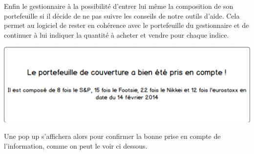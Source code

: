 \documentclass[french,12pt,a4paper]{article}
\begin{document}
Enfin le gestionnaire à la possibilité d'entrer lui même la composition de son portefeuille si il décide de ne pas suivre les conseils de notre outils d'aide. Cela permet au logiciel de rester en cohérence avec le portefeuille du gestionnaire et de continuer à lui indiquer la quantité à acheter et vendre pour chaque indice.
 

\newpage

\begin{center}
\includegraphics[scale=0.4]{../POPUP_1.png}
\end{center}

Une pop up s'affichera alors pour confirmer la bonne prise en compte de l'information, comme on peut le voir ci dessous.


\end{document}
